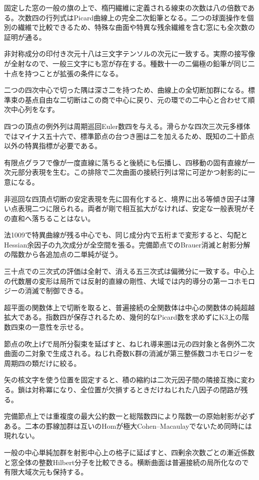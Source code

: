 \documentclass[11pt,a4paper]{ltjsarticle}
\begin{document}
固定した窓の一般の旗の上で、楕円繊維に定義される線束の次数は八の倍数である。次数四の行列式はPicard曲線上の完全二次鉛筆となる。二つの球面操作を個別の繊維で比較できるため、特殊な曲面や特異な残余繊維を含む窓にも全次数の証明が通る。

非対称成分の印付き次元十八は三文字テンソルの次元に一致する。実際の接写像が全射なので、一般三文字にも窓が存在する。種数十一の二偏極の鉛筆が同じ二十点を持つことが拡張の条件になる。

二つの四次中心で切った隅は深さ二を持つため、曲線上の全切断加群になる。標準束の基点自由な二切断はこの商で中心に戻り、元の環での二中心と合わせて順次中心列をなす。

四つの頂点の例外列は周期巡回Euler数四を与える。滑らかな四次三次元多様体ではマイナス五十六で、標準節点の台つき圏は二を加えるため、既知の二十節点以外の特異指標が必要である。

有限点グラフで像が一度直線に落ちると後続にも伝播し、四移動の固有直線が一次元部分表現を生む。この排除で二次曲面の接続行列は常に可逆かつ射影的に一意になる。

非巡回な四頂点切断の安定表現を先に固有化すると、境界に出る等傾き因子は薄い点表現二つに限られる。両者が剛で相互拡大がなければ、安定な一般表現がその直和へ落ちることはない。

法1009で特異曲線が残る中心でも、同じ成分内で五桁まで変形すると、勾配とHessian余因子の九次成分が全空間を張る。完備節点でのBrauer消滅と射影分解の階数から各追加点の二単純が従う。

三十点での三次式の評価は全射で、消える五三次式は偏微分に一致する。中心上の代数層の変形は局所では反射的直線の剛性、大域では内的導分の第一コホモロジーの消滅で制御できる。

超平面の関数体上で切断を取ると、普遍接続の全関数体は中心の関数体の純超越拡大である。指数四が保存されるため、幾何的なPicard数を求めずにK3上の階数四束の一意性を示せる。

節点の吹上げで局所分裂束を延ばすと、ねじれ導来圏は元の四対象と各例外二次曲面の二対象で生成される。ねじれ奇数K群の消滅が第三整係数コホモロジーを周期四の類だけに絞る。

矢の核文字を使う位置を固定すると、積の縮約は二次元因子間の隣接互換に変わる。鎖は対称冪になり、全位置が欠損するときだけねじれた八因子の閉路が残る。

完備節点上では重複度の最大公約数一と総階数四により階数一の原始射影が必ずある。二本の罫線加群は互いのHomが極大Cohen--Macaulayでないため同時には現れない。

一般の中心単純加群を射影中心上の格子に延ばすと、四剰余次数ごとの漸近係数と窓全体の整数Hilbert分子を比較できる。横断曲面は普遍接続の局所化なので有限大域次元も保持する。
\end{document}
